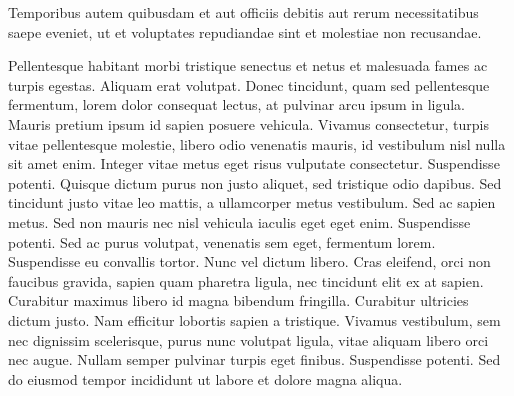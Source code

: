 Temporibus autem quibusdam et aut officiis debitis aut rerum necessitatibus saepe eveniet, ut et voluptates repudiandae sint et molestiae non recusandae.

Pellentesque habitant morbi tristique senectus et netus et malesuada fames ac turpis egestas. Aliquam erat volutpat. Donec tincidunt, quam sed pellentesque fermentum, lorem dolor consequat lectus, at pulvinar arcu ipsum in ligula. Mauris pretium ipsum id sapien posuere vehicula. Vivamus consectetur, turpis vitae pellentesque molestie, libero odio venenatis mauris, id vestibulum nisl nulla sit amet enim. Integer vitae metus eget risus vulputate consectetur. Suspendisse potenti. Quisque dictum purus non justo aliquet, sed tristique odio dapibus. Sed tincidunt justo vitae leo mattis, a ullamcorper metus vestibulum. Sed ac sapien metus. Sed non mauris nec nisl vehicula iaculis eget eget enim. Suspendisse potenti. Sed ac purus volutpat, venenatis sem eget, fermentum lorem. Suspendisse eu convallis tortor. Nunc vel dictum libero. Cras eleifend, orci non faucibus gravida, sapien quam pharetra ligula, nec tincidunt elit ex at sapien. Curabitur maximus libero id magna bibendum fringilla. Curabitur ultricies dictum justo. Nam efficitur lobortis sapien a tristique. Vivamus vestibulum, sem nec dignissim scelerisque, purus nunc volutpat ligula, vitae aliquam libero orci nec augue. Nullam semper pulvinar turpis eget finibus. Suspendisse potenti. Sed do eiusmod tempor incididunt ut labore et dolore magna aliqua. 
